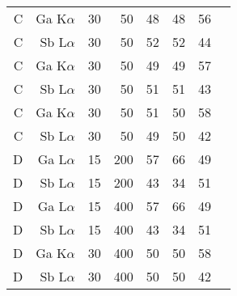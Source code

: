 \begin{table}[phtb]
\begin{center}
\begin{tabular}{rrrrrrrr}
            \hline
            C               & Ga K$\alpha$  & 30             & 50             & 48                               & 48                                 & 56                           \\
            C               & Sb L$\alpha$  & 30             & 50             & 52                               & 52                                 & 44                           \\
            C               & Ga K$\alpha$  & 30             & 50             & 49                               & 49                                 & 57                           \\
            C               & Sb L$\alpha$  & 30             & 50             & 51                               & 51                                 & 43                           \\
            C               & Ga K$\alpha$  & 30             & 50             & 51                               & 50                                 & 58                           \\
            C               & Sb L$\alpha$  & 30             & 50             & 49                               & 50                                 & 42                           \\
            \hline
            D               & Ga L$\alpha$  & 15             & 200            & 57                               & 66                                 & 49                           \\
            D               & Sb L$\alpha$  & 15             & 200            & 43                               & 34                                 & 51                           \\
            D               & Ga L$\alpha$  & 15             & 400            & 57                               & 66                                 & 49                           \\
            D               & Sb L$\alpha$  & 15             & 400            & 43                               & 34                                 & 51                           \\
            D               & Ga K$\alpha$  & 30             & 400            & 50                               & 50                                 & 58                           \\
            D               & Sb L$\alpha$  & 30             & 400            & 50                               & 50                                 & 42                           \\
            \hline
        \end{tabular}
    \end{center}
\end{table}
\restoregeometry %
